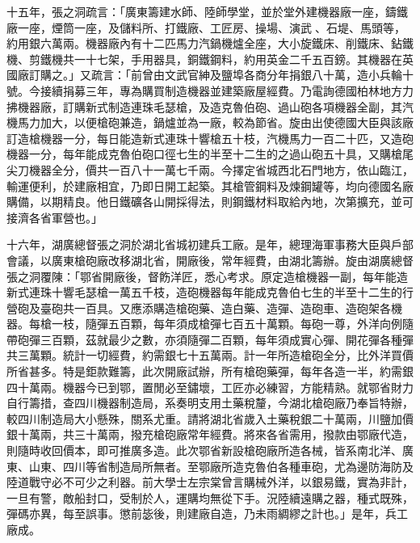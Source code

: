 \begin{pinyinscope}
十五年，張之洞疏言：「廣東籌建水師、陸師學堂，並於堂外建機器廠一座，鑄鐵廠一座，煙筒一座，及儲料所、打鐵廠、工匠房、操場、演武、石堤、馬頭等，約用銀六萬兩。機器廠內有十二匹馬力汽鍋機爐全座，大小旋鐵床、削鐵床、鉆鐵機、剪鐵機共一十七架，手用器具，銅鐵鋼料，約用英金二千五百鎊。其機器在英國廠訂購之。」又疏言：「前曾由文武官紳及鹽埠各商分年捐銀八十萬，造小兵輪十號。今接續捐募三年，專為購買制造機器並建築廠屋經費。乃電詢德國柏林地方力拂機器廠，訂購新式制造連珠毛瑟槍，及造克魯伯砲、過山砲各項機器全副，其汽機馬力加大，以便槍砲兼造，鍋爐並為一廠，較為節省。旋由出使德國大臣與該廠訂造槍機器一分，每日能造新式連珠十響槍五十枝，汽機馬力一百二十匹，又造砲機器一分，每年能成克魯伯砲口徑七生的半至十二生的之過山砲五十具，又購槍尾尖刀機器全分，價共一百八十一萬七千兩。今擇定省城西北石門地方，依山臨江，輸運便利，於建廠相宜，乃即日開工起築。其槍管鋼料及煉鋼罐等，均向德國名廠購備，以期精良。他日鐵礦各山開採得法，則鋼鐵材料取給內地，次第擴充，並可接濟各省軍營也。」

十六年，湖廣總督張之洞於湖北省城初建兵工廠。是年，總理海軍事務大臣與戶部會議，以廣東槍砲廠改移湖北省，開廠後，常年經費，由湖北籌辦。旋由湖廣總督張之洞覆陳：「鄂省開廠後，督飭洋匠，悉心考求。原定造槍機器一副，每年能造新式連珠十響毛瑟槍一萬五千枝，造砲機器每年能成克魯伯七生的半至十二生的行營砲及臺砲共一百具。又應添購造槍砲藥、造白藥、造彈、造砲車、造砲架各機器。每槍一枝，隨彈五百顆，每年須成槍彈七百五十萬顆。每砲一尊，外洋向例隨帶砲彈三百顆，茲就最少之數，亦須隨彈二百顆，每年須成實心彈、開花彈各種彈共三萬顆。統計一切經費，約需銀七十五萬兩。計一年所造槍砲全分，比外洋買價所省甚多。特是鉅款難籌，此次開廠試辦，所有槍砲藥彈，每年各造一半，約需銀四十萬兩。機器今已到鄂，置閒必至鏽壞，工匠亦必練習，方能精熟。就鄂省財力自行籌措，查四川機器制造局，系奏明支用土藥稅釐，今湖北槍砲廠乃奉旨特辦，較四川制造局大小懸殊，關系尤重。請將湖北省歲入土藥稅銀二十萬兩，川鹽加價銀十萬兩，共三十萬兩，撥充槍砲廠常年經費。將來各省需用，撥款由鄂廠代造，則隨時收回價本，即可推廣多造。此次鄂省新設槍砲廠所造各械，皆系南北洋、廣東、山東、四川等省制造局所無者。至鄂廠所造克魯伯各種車砲，尤為邊防海防及陸道戰守必不可少之利器。前大學士左宗棠曾言購械外洋，以銀易鐵，實為非計，一旦有警，敵船封口，受制於人，運購均無從下手。況陸續遠購之器，種式既殊，彈碼亦異，每至誤事。懲前毖後，則建廠自造，乃未雨綢繆之計也。」是年，兵工廠成。


\end{pinyinscope}
